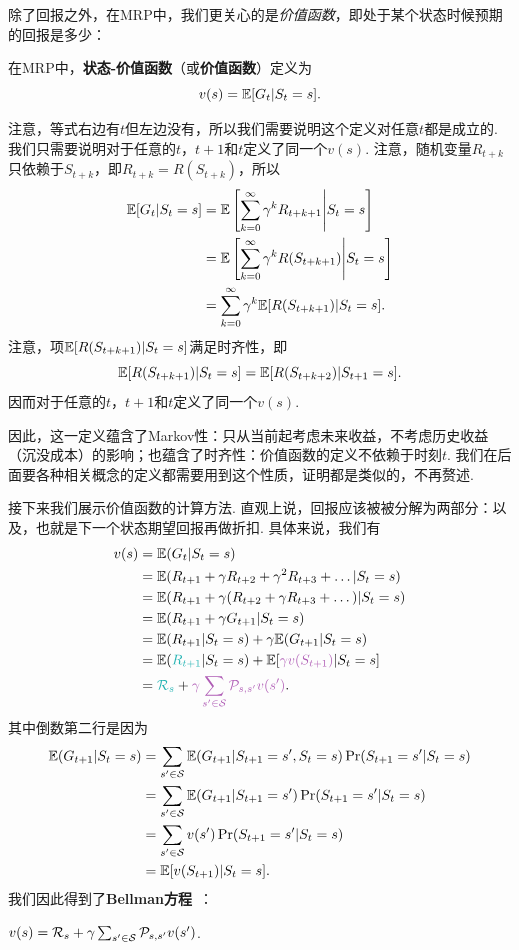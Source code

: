 除了回报之外，在MRP中，我们更关心的是\textit{价值函数}，即处于某个状态时候预期的回报是多少：
\begin{definition}[价值函数]
在MRP中，\textbf{状态-价值函数}（或\textbf{价值函数}）定义为
    \[v(s) = \mathbb{E}[G_t|S_t=s].\]
\end{definition}

注意，等式右边有$t$但左边没有，所以我们需要说明这个定义对任意$t$都是成立的. 我们只需要说明对于任意的$t$，$t+1$和$t$定义了同一个$v(s)$. 注意，随机变量$R_{t+k}$只依赖于$S_{t+k}$，即$R_{t+k}=R(S_{t+k})$，所以
\begin{align*}
    \mathbb{E}[G_t|S_t=s] &= \mathbb{E}\left[\sum_{k=0}^\infty \gamma^k R_{t+k+1}\middle|S_t=s\right] \\
    &= \mathbb{E}\left[\sum_{k=0}^\infty \gamma^k R(S_{t+k+1})\middle|S_t=s\right]\\
    &= \sum_{k=0}^\infty \gamma^k \mathbb{E}[R(S_{t+k+1})|S_t=s].
\end{align*}
注意，项$\mathbb{E}[R(S_{t+k+1})|S_t=s]$满足时齐性，即
\[\mathbb{E}[R(S_{t+k+1})|S_t=s]=\mathbb{E}[R(S_{t+k+2})|S_{t+1}=s].\]
因而对于任意的$t$，$t+1$和$t$定义了同一个$v(s)$.

因此，这一定义蕴含了Markov性：只从当前起考虑未来收益，不考虑历史收益（沉没成本）的影响；也蕴含了时齐性：价值函数的定义不依赖于时刻$t$. 我们在后面要各种相关概念的定义都需要用到这个性质，证明都是类似的，不再赘述.

接下来我们展示价值函数的计算方法. 直观上说，回报应该被被分解为两部分：以及，也就是下一个状态期望回报再做折扣. 具体来说，我们有
\begin{align*}
v(s) &= \E(G_t|S_t=s) \\
    &= \E(R_{t+1}+ \gamma R_{t+2} + \gamma^2 R_{t+3}+\dots | S_t= s) \\
    &= \E(R_{t+1} + \gamma (R_{t+2}+\gamma R_{t+3}+\dots) | S_t = s) \\
    &= \E(R_{t+1} + \gamma G_{t+1} | S_t = s) \\
    &= \E(R_{t+1} | S_t = s) + \gamma \E(G_{t+1} | S_t = s) \\
    &= \E(\contrastlight{R_{t+1}}|S_t=s) + \E[\light{\gamma v(S_{t+1})}|S_t=s]\\
    &= \contrastlight{\mathcal R_s} + \light{\gamma \sum_{s'\in \calS}\calP_{s,s'}v(s')}.
\end{align*}
其中倒数第二行是因为
\begin{align*}
    \mathbb{E}(G_{t+1}|S_t=s) &= \sum_{s'\in \mathcal S}\mathbb{E}(G_{t+1}|S_{t+1}=s',S_t=s)\Pr(S_{t+1}=s'|S_t=s)\\
    &= \sum_{s'\in \mathcal S}\mathbb{E}(G_{t+1}|S_{t+1}=s')\Pr(S_{t+1}=s'|S_t=s)\\
    &= \sum_{s'\in \mathcal S}v(s')\Pr(S_{t+1}=s'|S_t=s)\\
    &=\mathbb{E}[v(S_{t+1})|S_t=s].
\end{align*}
我们因此得到了\textbf{Bellman方程}~\cite{bellmanTheoryDynamicProgramming1952}：
\begin{theorem}[Bellman方程]\label{thm:MRP-Bellman}
    $v(s)=\mathcal R_s + \gamma \sum_{s'\in \mathcal S}\mathcal P_{s,s'}v(s')$.
\end{theorem}

